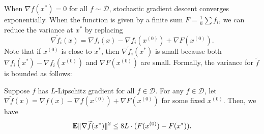 When $\nabla f(x^{*})=0$ for all $f\sim\mathcal{D}$, stochastic
gradient descent converges exponentially. When the function is given
by a finite sum $F=\frac{1}{n}\sum f_{i}$, we can reduce the variance
at $x^{*}$ by replacing 
\[
\nabla\widetilde{f}_{i}(x)=\nabla f_{i}(x)-\nabla f_{i}(x^{(0)})+\nabla F(x^{(0)}).
\]
Note that if $x^{(0)}$ is close to $x^{*}$, then $\nabla\widetilde{f}_{i}(x^{*})$
is small because both $\nabla f_{i}(x^{*})-\nabla f_{i}(x^{(0)})$
and $\nabla F(x^{(0)})$ are small. Formally, the variance for $\widetilde{f}$
is bounded as follows:
\begin{lem}
\label{lem:variance_reduction}Suppose $f$ has $L$-Lipschitz gradient
for all $f\in\mathcal{D}$. For any $f\in\mathcal{D}$, let $\nabla\widetilde{f}(x)=\nabla f(x)-\nabla f(x^{(0)})+\nabla F(x^{(0)})$
for some fixed $x^{(0)}$. Then, we have
\[
\mathbf{E}\|\nabla\widetilde{f}(x^{*})\|^{2}\leq8L\cdot(F(x^{(0)})-F(x^{*})).
\]
\end{lem}

